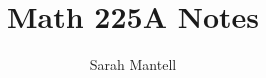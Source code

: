 \documentclass[
    letterpaper,
    fontsize=11pt,
    twoside=false,
    secnumdepth=1
]{kaonotes}
\begin{document}
    \title[Math 225A Notes]{Math 225A Notes}

    \author{Sarah Mantell}
    
    \frontmatter
    \maketitle

    \mainmatter
    
    
\end{document}
